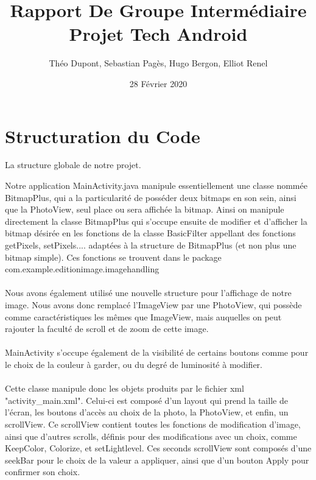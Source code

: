\documentclass[12pt]{article}
\title{
    {\myfont Rapport De Groupe Intermédiaire} \\
    \bigskip
    Projet Tech Android
    }
\author{Théo Dupont, Sebastian Pagès, Hugo Bergon, Elliot Renel}
\date{28 Février 2020}
\begin{document}
\maketitle
\bigskip
\bigskip
\bigskip

\tableofcontents

\section{Structuration du Code}
La structure globale de notre projet.


Notre application MainActivity.java manipule essentiellement une classe nommée BitmapPlus, qui a la particularité de posséder deux bitmaps en son sein, ainsi que la PhotoView,
 seul place ou sera affichée la bitmap. Ainsi on manipule directement la classe BitmapPlus qui s'occupe ensuite de modifier et d'afficher la bitmap désirée en 
 les fonctions de la classe BasicFilter appellant des fonctions getPixels, setPixels.... adaptées à la structure de BitmapPlus (et non plus une bitmap simple).
 Ces fonctions se trouvent dans le package com.example.editionimage.imagehandling\\
\\

Nous avons également utilisé une nouvelle structure pour l'affichage de notre image. 
Nous avons donc remplacé l'ImageView par une PhotoView, qui possède comme caractéristiques les mêmes que ImageView, 
mais auquelles on peut rajouter la faculté de scroll et de zoom de cette image.
\\

\\


MainActivity s'occupe également de la visibilité de certains boutons comme pour le choix de la couleur à garder, ou du degré de luminosité à modifier.\\
\\
Cette classe manipule donc les objets produits par le fichier xml "activity_main.xml".
Celui-ci est composé d'un layout qui prend la taille de l'écran, les boutons d'accès au choix de la photo, la PhotoView, et enfin, un scrollView.
Ce scrollView contient toutes les fonctions de modification d'image, ainsi que d'autres scrolls, définis pour des modifications avec un choix, comme KeepColor, Colorize, et setLightlevel.
Ces seconds scrollView sont composés d'une seekBar pour le choix de la valeur a appliquer, ainsi que d'un bouton Apply pour confirmer son choix.\\
\end{document}
